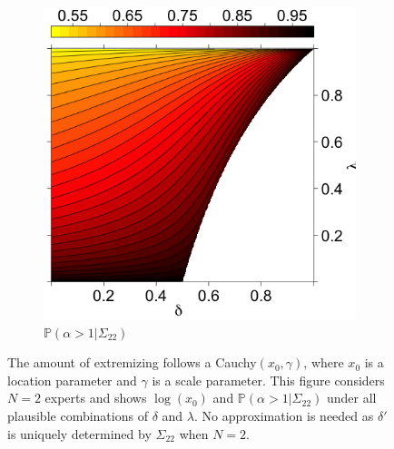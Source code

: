 \documentclass[11pt]{article}
\renewcommand{\P}{\mathbb{P}}
\theoremstyle{definition}
\theoremstyle{definition}
\def\P{{\mathbb P}}
\begin{document}
\begin{figure}[t]
\begin{subfigure}[b]{0.49\textwidth}
                \includegraphics[width=\textwidth, height = \textwidth]{Probs}
\caption{$\P(\alpha > 1 | \Sigma_{22})$}
\label{probOracle}
        \end{subfigure}

        \caption{ The amount of extremizing follows a Cauchy$(x_0, \gamma)$, where $x_0$ is a location parameter and $\gamma$ is a scale parameter. This figure considers  $N = 2$ experts and shows $\log(x_0)$ and $\P(\alpha > 1 | \Sigma_{22})$ under all plausible combinations of $\delta$ and $\lambda$. No approximation is needed as $\delta'$ is uniquely determined by $\Sigma_{22}$ when $N = 2$.}
        \label{LevelplotsOracle}
\end{figure}
\end{document}
